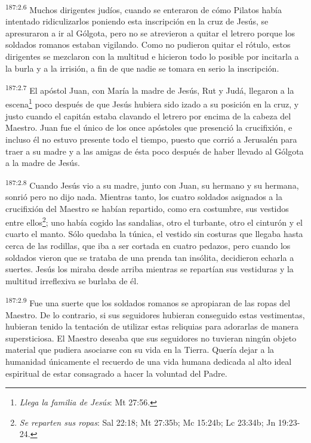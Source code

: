 \par
\textsuperscript{187:2.6} Muchos dirigentes judíos, cuando se enteraron de cómo Pilatos había intentado ridiculizarlos poniendo esta inscripción en la cruz de Jesús, se apresuraron a ir al Gólgota, pero no se atrevieron a quitar el letrero porque los soldados romanos estaban vigilando. Como no pudieron quitar el rótulo, estos dirigentes se mezclaron con la multitud e hicieron todo lo posible por incitarla a la burla y a la irrisión, a fin de que nadie se tomara en serio la inscripción.

\par
\textsuperscript{187:2.7} El apóstol Juan, con María la madre de Jesús, Rut y Judá, llegaron a la escena\footnote{\textit{Llega la familia de Jesús}: Mt 27:56.} poco después de que Jesús hubiera sido izado a su posición en la cruz, y justo cuando el capitán estaba clavando el letrero por encima de la cabeza del Maestro. Juan fue el único de los once apóstoles que presenció la crucifixión, e incluso él no estuvo presente todo el tiempo, puesto que corrió a Jerusalén para traer a su madre y a las amigas de ésta poco después de haber llevado al Gólgota a la madre de Jesús.

\par
\textsuperscript{187:2.8} Cuando Jesús vio a su madre, junto con Juan, su hermano y su hermana, sonrió pero no dijo nada. Mientras tanto, los cuatro soldados asignados a la crucifixión del Maestro se habían repartido, como era costumbre, sus vestidos entre ellos\footnote{\textit{Se reparten sus ropas}: Sal 22:18; Mt 27:35b; Mc 15:24b; Lc 23:34b; Jn 19:23-24.}; uno había cogido las sandalias, otro el turbante, otro el cinturón y el cuarto el manto. Sólo quedaba la túnica, el vestido sin costuras que llegaba hasta cerca de las rodillas, que iba a ser cortada en cuatro pedazos, pero cuando los soldados vieron que se trataba de una prenda tan insólita, decidieron echarla a suertes. Jesús los miraba desde arriba mientras se repartían sus vestiduras y la multitud irreflexiva se burlaba de él.

\par
\textsuperscript{187:2.9} Fue una suerte que los soldados romanos se apropiaran de las ropas del Maestro. De lo contrario, si sus seguidores hubieran conseguido estas vestimentas, hubieran tenido la tentación de utilizar estas reliquias para adorarlas de manera supersticiosa. El Maestro deseaba que sus seguidores no tuvieran ningún objeto material que pudiera asociarse con su vida en la Tierra. Quería dejar a la humanidad únicamente el recuerdo de una vida humana dedicada al alto ideal espiritual de estar consagrado a hacer la voluntad del Padre.

